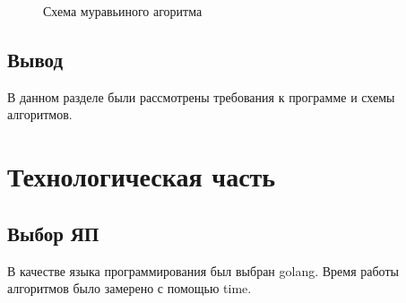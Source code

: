\documentclass[12pt]{report}
\begin{document}
\begin{figure}[h]
	\caption{Схема муравьиного агоритма}
	\label{fig:ant}
\end{figure}
\newpage

\section*{Вывод}
В данном разделе были рассмотрены требования к программе и схемы алгоритмов.


\chapter{Технологическая часть}

\section{Выбор ЯП}
В качестве языка программирования был выбран golang.
Время работы алгоритмов было замерено с помощью time. 
\end{document}
